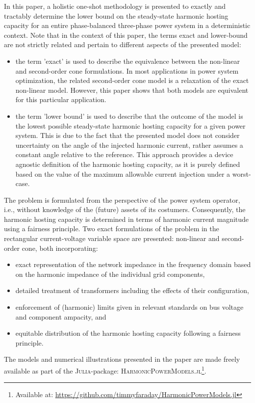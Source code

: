 In this paper, a holistic one-shot methodology is presented to exactly and tractably determine the lower bound on the steady-state harmonic hosting capacity for an entire phase-balanced three-phase power system in a deterministic context. Note that in the context of this paper, the terms exact and lower-bound are not strictly related and pertain to different aspects of the presented model:
\begin{itemize}
    \item the term 'exact' is used to describe the equivalence between the non-linear and second-order cone formulations. In most applications in power system optimization, the related second-order cone model is a relaxation of the exact non-linear model. However, this paper shows that both models are equivalent for this particular application.
    \item the term 'lower bound' is used to describe that the outcome of the model is the lowest possible steady-state harmonic hosting capacity for a given power system. This is due to the fact that the presented model does not consider uncertainty on the angle of the injected harmonic current, rather assumes a constant angle relative to the reference. This approach provides a device agnostic definition of the harmonic hosting capacity, as it is purely defined based on the value of the maximum allowable current injection under a worst-case.
\end{itemize}
The problem is formulated from the perspective of the power system operator, i.e., without knowledge of the (future) assets of its costumers. Consequently, the harmonic hosting capacity is determined in terms of harmonic current magnitude using a fairness principle. Two exact formulations of the problem in the rectangular current-voltage variable space are presented: non-linear and second-order cone, both incorporating: 
\begin{itemize}
    \item exact representation of the network impedance in the frequency domain based on the harmonic impedance of the individual grid components,
    \item detailed treatment of transformers including the effects of their configuration,
    \item enforcement of (harmonic) limits given in relevant standards on bus voltage and component ampacity, and
    \item equitable distribution of the harmonic hosting capacity following a fairness principle. 
\end{itemize}
The models and numerical illustrations presented in the paper are made freely available as part of the \textsc{Julia}-package: \textsc{HarmonicPowerModels.jl}\footnote{Available at: \href{https://github.com/timmyfaraday/HarmonicPowerModels.jl}{https://github.com/timmyfaraday/HarmonicPowerModels.jl}}.

